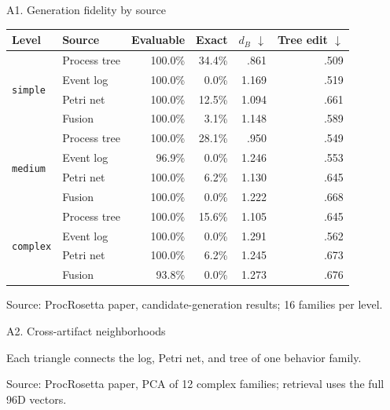 \documentclass[aspectratio=169,12pt]{beamer}
\newcommand{\paperfigure}[1]{%
  \begingroup
  \newenvironment{figure*}[1][]{\par\centering}{\par}
  \renewcommand{\caption}[1]{}
  \renewcommand{\label}[1]{}
  
  \endgroup
}
\newcommand{\source}[1]{\vfill{\tiny\color{prgray}Source: #1\par}}
\begin{document}
\begin{frame}[t]{A1. Generation fidelity by source}
  \vspace{2mm}
  \centering
  \scriptsize
  \renewcommand{\arraystretch}{1.03}
  \setlength{\tabcolsep}{3.4pt}
  \begin{tabular}{@{}llrrrr@{}}
    \toprule
    Level & Source & Evaluable & Exact & $d_B$ $\downarrow$ & Tree edit $\downarrow$ \\
    \midrule
    \multirow{4}{*}{\texttt{simple}}
      & Process tree & 100.0\% & 34.4\% & .861 & .509 \\
      & Event log    & 100.0\% & 0.0\%  & 1.169 & .519 \\
      & Petri net    & 100.0\% & 12.5\% & 1.094 & .661 \\
      & Fusion       & 100.0\% & 3.1\%  & 1.148 & .589 \\
    \midrule
    \multirow{4}{*}{\texttt{medium}}
      & Process tree & 100.0\% & 28.1\% & .950 & .549 \\
      & Event log    & 96.9\%  & 0.0\%  & 1.246 & .553 \\
      & Petri net    & 100.0\% & 6.2\%  & 1.130 & .645 \\
      & Fusion       & 100.0\% & 0.0\%  & 1.222 & .668 \\
    \midrule
    \multirow{4}{*}{\texttt{complex}}
      & Process tree & 100.0\% & 15.6\% & 1.105 & .645 \\
      & Event log    & 100.0\% & 0.0\%  & 1.291 & .562 \\
      & Petri net    & 100.0\% & 6.2\%  & 1.245 & .673 \\
      & Fusion       & 93.8\%  & 0.0\%  & 1.273 & .676 \\
    \bottomrule
  \end{tabular}
  \source{ProcRosetta paper, candidate-generation results; 16 families per level.}
\end{frame}

\begin{frame}[t]{A2. Cross-artifact neighborhoods}
  \vspace{-2mm}
  \paperfigure{figures/pca}
  \vspace{-1mm}
  \centering\small Each triangle connects the log, Petri net, and tree of one behavior family.
  \source{ProcRosetta paper, PCA of 12 complex families; retrieval uses the full 96D vectors.}
\end{frame}
\end{document}

